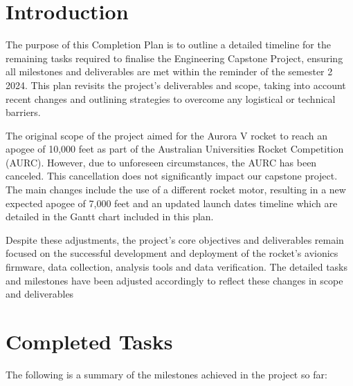 \pagestyle{fancy}

\section{Introduction}
The purpose of this Completion Plan is to outline a detailed timeline for the remaining tasks required to finalise the Engineering Capstone Project, ensuring all milestones and deliverables are met within the reminder of the semester 2 2024. This plan revisits the project's deliverables and scope, taking into account recent changes and outlining strategies to overcome any logistical or technical barriers.

The original scope of the project aimed for the Aurora V rocket to reach an apogee of 10,000 feet as part of the Australian Universities Rocket Competition (AURC). However, due to unforeseen circumstances, the AURC has been canceled. This cancellation does not significantly impact our capstone project. The main changes include the use of a different rocket motor, resulting in a new expected apogee of 7,000 feet and an updated launch dates timeline which are detailed in the Gantt chart included in this plan.

Despite these adjustments, the project's core objectives and deliverables remain focused on the successful development and deployment of the rocket's avionics firmware, data collection, analysis tools and data verification. The detailed tasks and milestones have been adjusted accordingly to reflect these changes in scope and deliverables

\section{Completed Tasks}
The following is a summary of the milestones achieved in the project so far:

